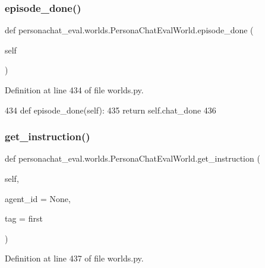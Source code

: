 \subsubsection{\texorpdfstring{episode\+\_\+done()}{episode\_done()}}
{\footnotesize\ttfamily def personachat\+\_\+eval.\+worlds.\+Persona\+Chat\+Eval\+World.\+episode\+\_\+done (\begin{DoxyParamCaption}\item[{}]{self }\end{DoxyParamCaption})}



Definition at line 434 of file worlds.\+py.


\begin{DoxyCode}
434     \textcolor{keyword}{def }episode\_done(self):
435         \textcolor{keywordflow}{return} self.chat\_done
436 
\end{DoxyCode}
\mbox{\label{classpersonachat__eval_1_1worlds_1_1PersonaChatEvalWorld_adc9e9dea06a5ede71146239f46957840}} 
\subsubsection{\texorpdfstring{get\+\_\+instruction()}{get\_instruction()}}
{\footnotesize\ttfamily def personachat\+\_\+eval.\+worlds.\+Persona\+Chat\+Eval\+World.\+get\+\_\+instruction (\begin{DoxyParamCaption}\item[{}]{self,  }\item[{}]{agent\+\_\+id = {\ttfamily None},  }\item[{}]{tag = {\ttfamily \textquotesingle{}first\textquotesingle{}} }\end{DoxyParamCaption})}



Definition at line 437 of file worlds.\+py.


